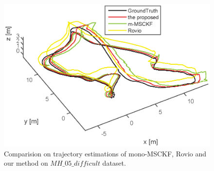 \documentclass[a4paper, 10pt, conference]{ieeeconf}      %
\begin{document}
\begin{figure}[thpb]
	\centering
	
	\includegraphics[scale=0.6]{MH05_3compare_legend.eps}
	
	\caption{Comparision on trajectory estimations of  mono-MSCKF, Rovio and our method on $MH\_05\_difficult$ dataset. }
	\label{figurelabel}
\end{figure}
\end{document}
